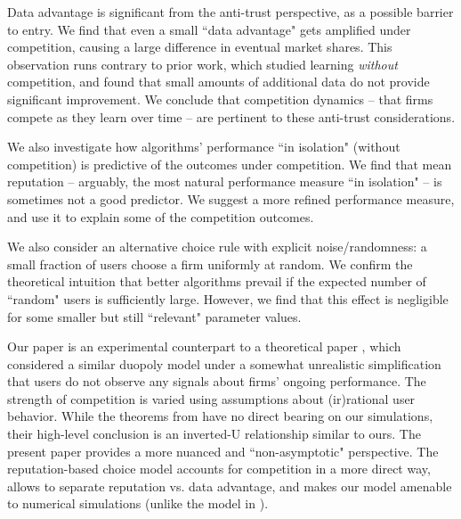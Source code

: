 \documentclass[acmsmall]{ec19acm}
\theoremstyle{definition}
\newcommand{\xhdr}[1]{\vspace{1mm} \noindent{\bf #1}}
\begin{document}
Data advantage is significant from the anti-trust perspective, as a possible barrier to entry. We find that even a small ``data advantage" gets amplified under competition, causing a large difference in eventual market shares. This observation runs contrary to prior work,  %
which studied learning \emph{without} competition, and found that small amounts of additional data do not provide significant improvement. We conclude that competition dynamics -- that firms compete as they learn over time -- are pertinent to these anti-trust considerations.

We also investigate how algorithms' performance ``in isolation" (without competition) is predictive of the outcomes under competition. We find that mean reputation -- arguably, the most natural performance measure ``in isolation" -- is sometimes not a good predictor. We suggest a
more refined performance measure, and use it to explain some of the competition outcomes.


We also consider an alternative choice rule with explicit noise/randomness: a small fraction of users choose a firm uniformly at random. We confirm the theoretical intuition that better algorithms prevail if the expected number of ``random" users is sufficiently large. However, we find that this effect is negligible for some smaller but still ``relevant" parameter values.


\xhdr{Discussion.}
Our paper is an experimental counterpart to a theoretical paper \cite{CompetingBandits-itcs18}, which considered a similar duopoly model under a somewhat unrealistic simplification that users do not observe any signals about firms' ongoing performance. The strength of competition is varied using assumptions about (ir)rational user behavior. While the theorems from \cite{CompetingBandits-itcs18} have no direct bearing on our simulations, their high-level conclusion is an inverted-U relationship similar to ours. The present paper provides a more nuanced and ``non-asymptotic" perspective. The reputation-based choice model accounts for competition in a more direct way, allows to separate reputation vs. data advantage, and makes our model amenable to numerical simulations (unlike the model in \cite{CompetingBandits-itcs18}).



\end{document}
